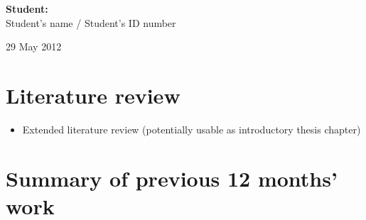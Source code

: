\documentclass[useAMS,usenatbib,onecolumn]{mnras}
\begin{document}
\begin{flushright}
{\bf Student:}\\
Student's name / Student's ID number
\end{flushright}\hspace{8cm}


\begin{center}
29 May 2012
\end{center}
\newpage

\date{Date of the review}

\section{Literature review}
\label{sec:LiteratureReview}

\begin{itemize}
	\item{Extended literature review (potentially usable as introductory thesis chapter)}
\end{itemize}

\section{Summary of previous 12 months' work}
\label{sec:summarypast}
\end{document}
